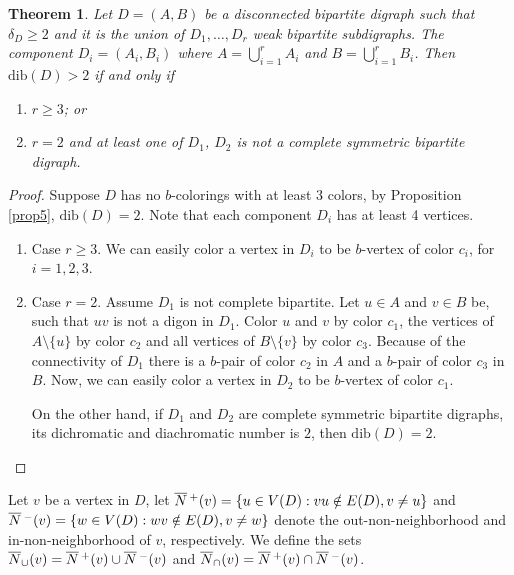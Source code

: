 \documentclass[12pt]{article}
\newtheorem{theorem}{Theorem}
\begin{document}
\begin{theorem}\label{teo9}
Let $D=(A, B)$ be a disconnected bipartite digraph such that $\delta_D\geq 2$ and it is the union of $D_1, \dots,D_r$ weak bipartite subdigraphs. The component $D_i=(A_i,B_i)$ where $A=\bigcup_{i=1}^rA_i$ and $B=\bigcup_{i=1}^rB_i$. Then $\text{dib}(D)>2$ if and only if 
\begin{enumerate}
\item $r\geq 3$; or

\item $r=2$ and at least one of $D_1$, $D_2$ is not a complete symmetric bipartite digraph.

\end{enumerate}
\end{theorem}
\begin{proof}
Suppose $D$ has no $b$-colorings with at least $3$ colors, by Proposition \ref{prop5}, $\text{dib}(D)=2$. Note that each component $D_i$ has at least 4 vertices.

\begin{enumerate}
\item Case $r\geq 3$. We can easily color a vertex in $D_i$ to be $b$-vertex of color $c_i$, for $i=1,2,3$.

\item Case $r= 2$. Assume $D_1$ is not complete bipartite. Let $u \in A$ and $v \in B$ be, such that $uv$ is not a digon in $D_1$. Color $u$ and $v$ by color $c_1$, the vertices of $A \setminus \{u\}$ by color $c_2$ and all vertices of $B \setminus \{v\}$ by color $c_3$. Because of the connectivity of $D_1$ there is a $b$-pair of color
$c_2$ in $A$ and a $b$-pair of color $c_3$ in $B$. Now, we can easily color a vertex in $D_2$ to be $b$-vertex of color $c_1$.

On the other hand, if $D_1$ and $D_2$ are complete symmetric bipartite digraphs, its dichromatic and diachromatic number is $2$, then $\text{dib}(D) = 2$.

\end{enumerate}
\end{proof}

Let $v$ be a vertex in $D$, let $\overline{N}\text{\,}^  +(v)=\{u\in V(D):vu \notin E(D), v\neq u \}$ and  $\overline{N}\text{\,}^-(v)=\{w\in V(D):wv \notin E(D), v\neq w \}$ denote the out-non-neighborhood and in-non-neighborhood of $v$, respectively. We define the sets $\overline{N}_{\cup}(v)= \overline{N}\text{\,}^+(v) \cup \overline{N}\text{\,}^-(v)$ and $\overline{N}_{\cap}(v)= \overline{N}\text{\,}^+(v) \cap \overline{N}\text{\,}^-(v)$.
\end{document}
